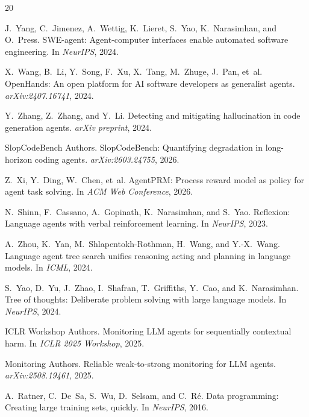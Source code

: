 \documentclass[11pt,a4paper]{article}
\begin{document}
\begin{thebibliography}{20}

J.~Yang, C.~Jimenez, A.~Wettig, K.~Lieret, S.~Yao, K.~Narasimhan, and O.~Press.
SWE-agent: Agent-computer interfaces enable automated software engineering.
In \emph{NeurIPS}, 2024.

X.~Wang, B.~Li, Y.~Song, F.~Xu, X.~Tang, M.~Zhuge, J.~Pan, et~al.
OpenHands: An open platform for AI software developers as generalist agents.
\emph{arXiv:2407.16741}, 2024.

Y.~Zhang, Z.~Zhang, and Y.~Li.
Detecting and mitigating hallucination in code generation agents.
\emph{arXiv preprint}, 2024.

{SlopCodeBench Authors}.
SlopCodeBench: Quantifying degradation in long-horizon coding agents.
\emph{arXiv:2603.24755}, 2026.

Z.~Xi, Y.~Ding, W.~Chen, et~al.
AgentPRM: Process reward model as policy for agent task solving.
In \emph{ACM Web Conference}, 2026.

N.~Shinn, F.~Cassano, A.~Gopinath, K.~Narasimhan, and S.~Yao.
Reflexion: Language agents with verbal reinforcement learning.
In \emph{NeurIPS}, 2023.

A.~Zhou, K.~Yan, M.~Shlapentokh-Rothman, H.~Wang, and Y.-X.~Wang.
Language agent tree search unifies reasoning acting and planning in language models.
In \emph{ICML}, 2024.

S.~Yao, D.~Yu, J.~Zhao, I.~Shafran, T.~Griffiths, Y.~Cao, and K.~Narasimhan.
Tree of thoughts: Deliberate problem solving with large language models.
In \emph{NeurIPS}, 2024.

{ICLR Workshop Authors}.
Monitoring LLM agents for sequentially contextual harm.
In \emph{ICLR 2025 Workshop}, 2025.

{Monitoring Authors}.
Reliable weak-to-strong monitoring for LLM agents.
\emph{arXiv:2508.19461}, 2025.

A.~Ratner, C.~De~Sa, S.~Wu, D.~Selsam, and C.~R\'{e}.
Data programming: Creating large training sets, quickly.
In \emph{NeurIPS}, 2016.

\end{thebibliography}
\end{document}
